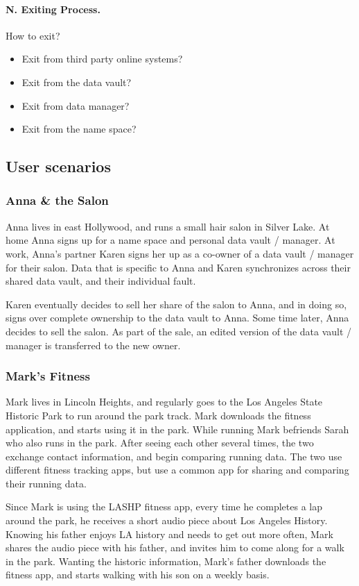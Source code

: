 \paragraph*{N. Exiting Process.}
How to exit?
\begin{itemize}
\item Exit from third party online systems? 
\item Exit from the data vault? 
\item Exit from data manager? 
\item Exit from the name space? 
\end{itemize}

\subsection{User scenarios}

\subsubsection{Anna \& the Salon}
Anna lives in east Hollywood, and runs a small hair salon in Silver Lake. At home Anna signs up for a name space and personal data vault / manager. At work, Anna's partner Karen signs her up as a co-owner of a data vault / manager for their salon. Data that is specific to Anna and Karen synchronizes across their shared data vault, and their individual fault.  

Karen eventually decides to sell her share of the salon to Anna, and in doing so, signs over complete ownership to the data vault to Anna. Some time later, Anna decides to sell the salon. As part of the sale, an edited version of the data vault / manager is transferred to the new owner. 

\subsubsection{Mark's Fitness}
Mark lives in Lincoln Heights, and regularly goes to the Los Angeles State Historic Park to run around the park track. Mark downloads the fitness application, and starts using it in the park. While running Mark befriends Sarah who also runs in the park. After seeing each other several times, the two exchange contact information, and begin comparing running data. The two use different fitness tracking apps, but use a common app for sharing and comparing their running data. 

Since Mark is using the LASHP fitness app, every time he completes a lap around the park, he receives a short audio piece about Los Angeles History. Knowing his father enjoys LA history and needs to get out more often, Mark shares the audio piece with his father, and  invites him to come along for a walk in the park. Wanting the historic information, Mark's father downloads the fitness app, and starts walking with his son on a weekly basis. 


